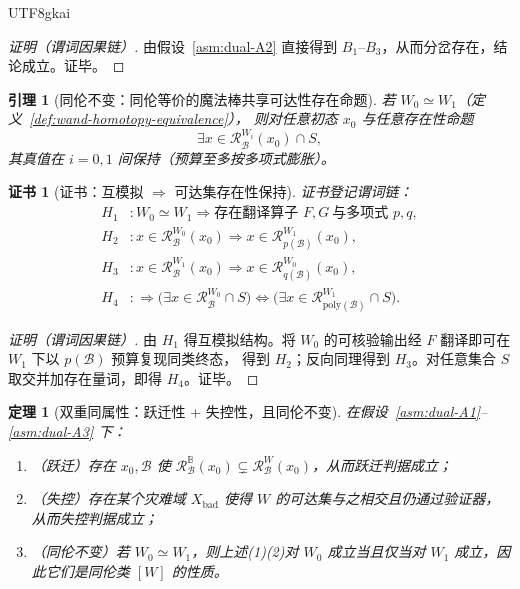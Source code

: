 \documentclass[12pt]{article}
\newtheorem{theorem}{定理}[section]
\newtheorem{lemma}{引理}[section]
\newtheorem{Certificate}{证书}[section]
\begin{document}
\begin{CJK*}{UTF8}{gkai}
\begin{proof}[证明（谓词因果链）]
由假设~\ref{asm:dual-A2} 直接得到 $B_1$--$B_3$，从而分岔存在，结论成立。证毕。
\end{proof}

\begin{lemma}[同伦不变：同伦等价的魔法棒共享可达性存在命题]
\label{lem:dual-homotopy-invariant-reachability}
若 $W_0\simeq W_1$（定义~\ref{def:wand-homotopy-equivalence}），
则对任意初态 $x_0$ 与任意存在性命题
\[
  \exists x\in \mathcal{R}^{W_i}_{\mathcal{B}}(x_0)\cap S,
\]
其真值在 $i=0,1$ 间保持（预算至多按多项式膨胀）。
\end{lemma}

\begin{Certificate}[证书：互模拟 $\Rightarrow$ 可达集存在性保持]
\label{cert:dual-homotopy-invariant-reachability}
证书登记谓词链：
\[
\begin{aligned}
  H_1 &: W_0\simeq W_1\Rightarrow \text{存在翻译算子 }F,G\ \text{与多项式 }p,q,\\
  H_2 &: x\in \mathcal{R}^{W_0}_{\mathcal{B}}(x_0)\Rightarrow x\in \mathcal{R}^{W_1}_{p(\mathcal{B})}(x_0),\\
  H_3 &: x\in \mathcal{R}^{W_1}_{\mathcal{B}}(x_0)\Rightarrow x\in \mathcal{R}^{W_0}_{q(\mathcal{B})}(x_0),\\
  H_4 &: \Rightarrow \bigl(\exists x\in \mathcal{R}^{W_0}_{\mathcal{B}}\cap S\bigr)\Longleftrightarrow \bigl(\exists
    x\in \mathcal{R}^{W_1}_{\mathrm{poly}(\mathcal{B})}\cap S\bigr).
\end{aligned}
\]
\end{Certificate}

\begin{proof}[证明（谓词因果链）]
由 $H_1$ 得互模拟结构。将 $W_0$ 的可核验输出经 $F$ 翻译即可在 $W_1$ 下以 $p(\mathcal{B})$ 预算复现同类终态，
得到 $H_2$；反向同理得到 $H_3$。对任意集合 $S$ 取交并加存在量词，即得 $H_4$。证毕。
\end{proof}

\begin{theorem}[双重同属性：跃迁性 + 失控性，且同伦不变]
\label{thm:dual-properties}
在假设~\ref{asm:dual-A1}--\ref{asm:dual-A3} 下：
\begin{enumerate}
  \item （跃迁）存在 $x_0,\mathcal{B}$ 使 $\mathcal{R}^{\mathbb{B}}_{\mathcal{B}}(x_0)\subsetneq \mathcal{R}^{W}_{\mathcal{B}}
    (x_0)$，从而跃迁判据成立；
  \item （失控）存在某个灾难域 $X_{\mathrm{bad}}$ 使得 $W$ 的可达集与之相交且仍通过验证器，从而失控判据成立；
  \item （同伦不变）若 $W_0\simeq W_1$，则上述(1)(2)对 $W_0$ 成立当且仅当对 $W_1$ 成立，因此它们是同伦类 $[W]$ 的性质。
\end{enumerate}
\end{theorem}


\end{CJK*}
\end{document}
